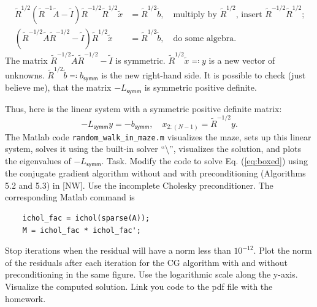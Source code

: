 \documentclass{../../../kin_math}
\begin{document}
\begin{questions}
\begin{align}
    \tilde{R}^{1/2} (\tilde{R}^{-1} \tilde{A} - \tilde{I}) \tilde{R}^{-1/2} \tilde{R}^{1/ 2} \tilde{x} &= \tilde{R}^{1 / 2} \tilde{b}, \quad \text{multiply by $\tilde{R}^{1/2}$, insert $\tilde{R}^{-1/2} \tilde{R}^{1/ 2}$;} \\
    (\tilde{R}^{-1/2} \tilde{A} \tilde{R}^{-1/2} - \tilde{I}) \tilde{R}^{1/ 2} \tilde{x} &= \tilde{R}^{1 / 2} \tilde{b}, \quad \text{do some algebra.}
  \end{align}
  The matrix $\tilde{R}^{-1/2} \tilde{A} \tilde{R}^{-1/2} - \tilde{I}$ is symmetric. $\tilde{R}^{1/2} \tilde{x} \eqqcolon y$ is a new vector of unknowns. $\tilde{R}^{1/2} \tilde{b} \eqqcolon b_\textsf{symm}$ is the new right-hand side. It is possible to check (just believe me), that the matrix $-L_\textsf{symm}$ is symmetric positive definite.

  Thus, here is the linear system with a symmetric positive definite matrix:
  \begin{equation}
    \label{eq:boxed}
    \boxed{-L_\textsf{symm} y = -b_\textsf{symm}, \quad x_{2:(N - 1)} = \tilde{R}^{-1/2}y.}
  \end{equation}
  The Matlab code \texttt{random\_walk\_in\_maze.m} visualizes the maze, sets up this linear system, solves it using the built-in solver ``\textbackslash'', visualizes the solution, and plots the eigenvalues of $-L_\textsf{symm}$. Task. Modify the code to solve Eq. (\ref{eq:boxed}) using the conjugate gradient algorithm without and with preconditioning (Algorithms 5.2 and 5.3) in [NW]. Use the incomplete Cholesky preconditioner. The corresponding Matlab command is
  \begin{verbatim}
    ichol_fac = ichol(sparse(A));
    M = ichol_fac * ichol_fac';\end{verbatim}
Stop iterations when the residual will have a norm less than $10^{-12}$. Plot the norm of the residuals after each iteration for the CG algorithm with and without preconditioning in the same figure. Use the logarithmic scale along the y-axis. Visualize the computed solution. Link you code to the pdf file with the homework.


\end{questions}
\end{document}
